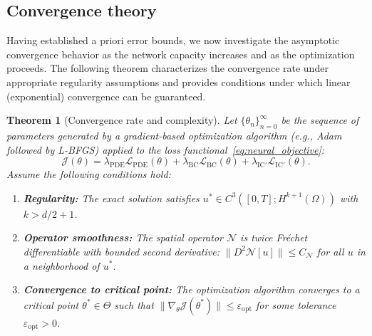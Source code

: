 \documentclass[11pt,reqno]{amsart}
\theoremstyle{plain}
\newtheorem{theorem}{Theorem}[section]
\theoremstyle{definition}
\theoremstyle{remark}
\begin{document}
\subsection{Convergence theory}

Having established a priori error bounds, we now investigate the asymptotic convergence behavior as the network capacity increases and as the optimization proceeds. The following theorem characterizes the convergence rate under appropriate regularity assumptions and provides conditions under which linear (exponential) convergence can be guaranteed.

\begin{theorem}[Convergence rate and complexity]\label{thm:convergence_rate}
Let $\{\theta_n\}_{n=0}^\infty$ be the sequence of parameters generated by a gradient-based optimization algorithm (e.g., Adam followed by L-BFGS) applied to the loss functional~\eqref{eq:neural_objective}:
\begin{equation}
    \mathcal{J}(\theta) = \lambda_{\mathrm{PDE}} \mathcal{L}_{\mathrm{PDE}}(\theta) + \lambda_{\mathrm{BC}} \mathcal{L}_{\mathrm{BC}}(\theta) + \lambda_{\mathrm{IC}'} \mathcal{L}_{\mathrm{IC}'}(\theta).
\end{equation}
Assume the following conditions hold:

\begin{enumerate}[label=(\roman*)]
    \item \textbf{Regularity:} The exact solution satisfies $u^* \in C^3([0,T]; H^{k+1}(\Omega))$ with $k > d/2 + 1$.
    
    \item \textbf{Operator smoothness:} The spatial operator $\mathcal{N}$ is twice Fréchet differentiable with bounded second derivative: $\|D^2\mathcal{N}[u]\| \leq C_{\mathcal{N}}$ for all $u$ in a neighborhood of $u^*$.
    
    \item \textbf{Convergence to critical point:} The optimization algorithm converges to a critical point $\theta^* \in \Theta$ such that $\|\nabla_\theta \mathcal{J}(\theta^*)\| \leq \varepsilon_{\mathrm{opt}}$ for some tolerance $\varepsilon_{\mathrm{opt}} > 0$.
    

\end{enumerate}
\end{theorem}
\end{document}
